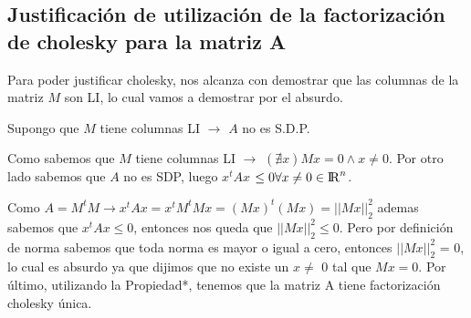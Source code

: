 

\subsection{Justificación de utilización de la factorización de cholesky para la matriz A}

Para poder justificar cholesky, nos alcanza con demostrar que las columnas de la matriz $M$ son LI, lo cual vamos a demostrar por el absurdo.\par
\indent Supongo que $M$ tiene columnas LI $\rightarrow$ $A$ no es S.D.P. \par 
\indent Como sabemos que $M$ tiene columnas LI $\rightarrow$ $(\nexists x ) Mx = 0 \land x \neq 0 $. Por otro lado sabemos que $A$ no es SDP, luego $x^{t}Ax$ $\leq 0 \forall x \neq 0 \in {\rm I\!R}^{n}$.\par Como $A = M^{t}M \rightarrow x^{t}Ax = x^{t}M^{t}Mx = (Mx)^{t}(Mx) = ||Mx||_{2}^{2}$ ademas sabemos que $x^{t}Ax \leq 0$, entonces nos queda que $||Mx||_{2}^{2} \leq 0$. Pero por definición de norma sabemos que toda norma es mayor o igual a cero, entonces $||Mx||_{2}^{2}$ = 0, lo cual es absurdo ya que dijimos que no existe un $x \neq$ 0 tal que $Mx = 0$. Por último, utilizando la Propiedad*, tenemos que la matriz A tiene factorización cholesky única.

